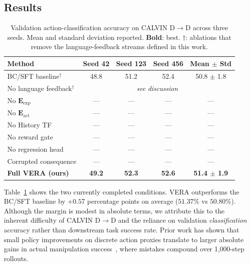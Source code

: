 \documentclass{article}
\newcommand{\vera}{\textsc{VERA}}
\newcommand{\eact}{$\mathbf{E}_\text{act}$}
\newcommand{\eexp}{$\mathbf{E}_\text{exp}$}
\begin{document}
\subsection{Results}
\label{sec:results}

\begin{table}[t]
\centering
\caption{
  Validation action-classification accuracy on CALVIN D$\rightarrow$D across three seeds.
  Mean and standard deviation reported. \textbf{Bold}: best. $\dagger$: ablations
  that remove the language-feedback streams defined in this work.
}
\label{tab:results}
\small
\setlength{\tabcolsep}{5pt}
\begin{tabular}{lcccc}
\toprule
\textbf{Method} & \textbf{Seed 42} & \textbf{Seed 123} & \textbf{Seed 456}
                & \textbf{Mean $\pm$ Std} \\
\midrule
BC/SFT baseline$^\dagger$     & 48.8 & 51.2 & 52.4 & 50.8 $\pm$ 1.8 \\
No language feedback$^\dagger$ & \multicolumn{4}{c}{\textit{see discussion}} \\
\midrule
No \eexp{}                    & ---  & ---  & ---  & --- \\
No \eact{}                    & ---  & ---  & ---  & --- \\
No History TF                 & ---  & ---  & ---  & --- \\
No reward gate                & ---  & ---  & ---  & --- \\
No regression head            & ---  & ---  & ---  & --- \\
Corrupted consequence         & ---  & ---  & ---  & --- \\
\midrule
\textbf{Full \vera{} (ours)}  & \textbf{49.2} & \textbf{52.3} & \textbf{52.6}
                               & \textbf{51.4 $\pm$ 1.9} \\
\bottomrule
\end{tabular}
\end{table}

Table~\ref{tab:results} shows the two currently completed conditions.
\vera{} outperforms the BC/SFT baseline by $+0.57$ percentage points on average
($51.37\%$ vs $50.80\%$).
Although the margin is modest in absolute terms, we attribute this to the inherent
difficulty of CALVIN D$\rightarrow$D and the reliance on validation \emph{classification}
accuracy rather than downstream task success rate.
Prior work has shown that small policy improvements on discrete action proxies translate
to larger absolute gains in actual manipulation success~\citep{calvin}, where mistakes
compound over 1,000-step rollouts.
\end{document}
